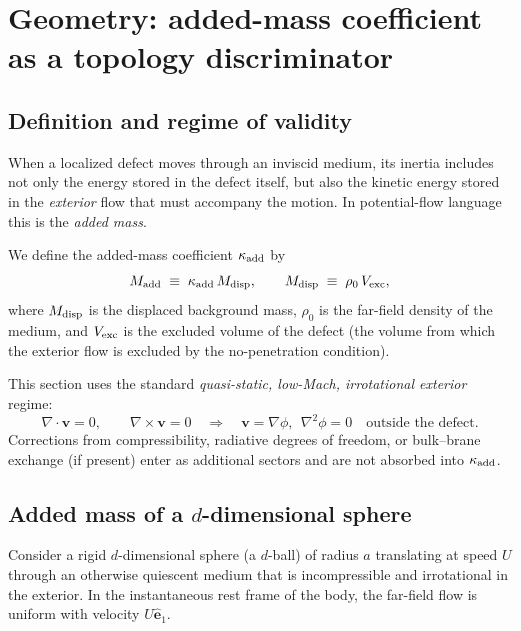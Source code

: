 \documentclass[11pt]{article}
\begin{document}
\section{Geometry: added-mass coefficient as a topology discriminator}
\label{sec:added_mass}

\subsection{Definition and regime of validity}

When a localized defect moves through an inviscid medium, its inertia includes not only the energy stored in the defect itself, but also the kinetic energy stored in the \emph{exterior} flow that must accompany the motion.  In potential-flow language this is the \emph{added mass}.

We define the added-mass coefficient \(\kappa_{\rm add}\) by
\begin{equation}
  M_{\rm add} \;\equiv\; \kappa_{\rm add}\,M_{\rm disp},
  \qquad
  M_{\rm disp} \;\equiv\; \rho_0\,V_{\rm exc},
\end{equation}
where \(M_{\rm disp}\) is the displaced background mass, \(\rho_0\) is the far-field density of the medium, and \(V_{\rm exc}\) is the excluded volume of the defect (the volume from which the exterior flow is excluded by the no-penetration condition).

This section uses the standard \emph{quasi-static, low-Mach, irrotational exterior} regime:
\begin{equation}
  \nabla\cdot \mathbf v = 0, \qquad \nabla\times \mathbf v = 0
  \quad\Rightarrow\quad \mathbf v = \nabla\phi,\ \ \nabla^2\phi=0
  \quad \text{outside the defect.}
\end{equation}
Corrections from compressibility, radiative degrees of freedom, or bulk--brane exchange (if present) enter as additional sectors and are not absorbed into \(\kappa_{\rm add}\).

\subsection{Added mass of a \(d\)-dimensional sphere}

Consider a rigid \(d\)-dimensional sphere (a \(d\)-ball) of radius \(a\) translating at speed \(U\) through an otherwise quiescent medium that is incompressible and irrotational in the exterior.  In the instantaneous rest frame of the body, the far-field flow is uniform with velocity \(U\hat{\mathbf e}_1\).
\end{document}
